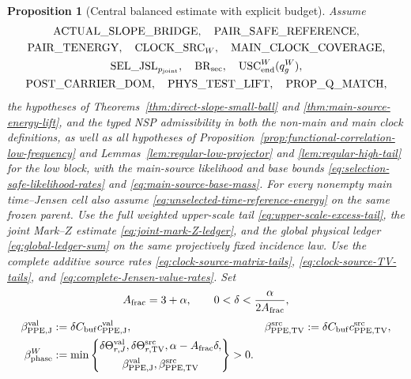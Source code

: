 \documentclass[11pt]{article}
\newtheorem{proposition}[theorem]{Proposition}
\begin{document}
\begin{proposition}[Central balanced estimate with explicit budget]
\label{prop:central-phase-verification}
Assume
\[
 \begin{gathered}
 \mathrm{ACTUAL\_SLOPE\_BRIDGE},\quad
 \mathrm{PAIR\_SAFE\_REFERENCE},\\
 \mathrm{PAIR\_TENERGY},\quad
 \mathrm{CLOCK\_SRC}_{W},\quad
 \mathrm{MAIN\_CLOCK\_COVERAGE},\\
 \mathrm{SEL\_JSL}_{p_{\rm joint}},\quad
 \mathrm{BR}_{\rm sec},\quad
 \mathrm{USC}_{\rm end}^{W}(q_g^W),\\
 \mathrm{POST\_CARRIER\_DOM},\quad
 \mathrm{PHYS\_TEST\_LIFT},\quad
 \mathrm{PROP\_Q\_MATCH},
 \end{gathered}
\]
the hypotheses of Theorems~\ref{thm:direct-slope-small-ball} and
\ref{thm:main-source-energy-lift}, and the typed NSP admissibility in both
the non-main and main clock definitions,
as well as all hypotheses of
Proposition~\ref{prop:functional-correlation-low-frequency} and
Lemmas~\ref{lem:regular-low-projector} and
\ref{lem:regular-high-tail} for the low block,
with the main-source likelihood and base bounds
\eqref{eq:selection-safe-likelihood-rates} and
\eqref{eq:main-source-base-mass}.  For every nonempty main time--Jensen cell
also assume \eqref{eq:unselected-time-reference-energy} on the same frozen
parent.  Use
the full weighted upper-scale tail \eqref{eq:upper-scale-excess-tail}, the
joint Mark--$Z$ estimate \eqref{eq:joint-mark-Z-ledger}, and the global
physical ledger \eqref{eq:global-ledger-sum} on the same projectively fixed
incidence law.  Use
the complete additive source rates
\eqref{eq:clock-source-matrix-tails},
\eqref{eq:clock-source-TV-tails}, and
\eqref{eq:complete-Jensen-value-rates}.  Set
\[
 A_{\rm frac}=3+\alpha,\qquad
 0<\delta<\frac{\alpha}{2A_{\rm frac}},
\]
\begin{equation}
\label{eq:complete-phase-exponent}
\begin{aligned}
 \beta_{\rm PPE,J}^{\rm val}&:=
   \delta C_{\rm buf}c_{\rm PPE,J}^{\rm val},
 &\beta_{\rm PPE,TV}^{\rm src}&:=
   \delta C_{\rm buf}c_{\rm PPE,TV}^{\rm src},\\
 \beta_{\rm phase}^{W}&:=
 \min\left\{
 \begin{gathered}
  \delta\Theta_{r,J}^{\rm val},
  \delta\Theta_{r,\rm TV}^{\rm src},
  \alpha-A_{\rm frac}\delta,\\
  \beta_{\rm PPE,J}^{\rm val},
  \beta_{\rm PPE,TV}^{\rm src}
 \end{gathered}
 \right\}>0.
\end{aligned}

\end{equation}
\end{proposition}
\end{document}
